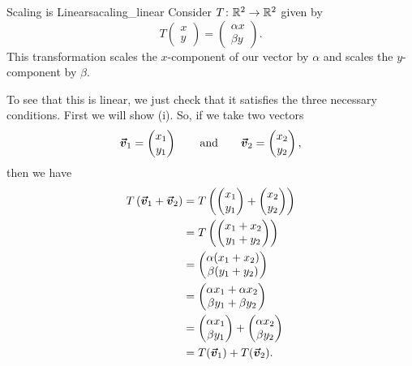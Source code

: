         \begin{ex}{Scaling is Linear}{sacaling_linear}
        Consider $T \colon \mathbb{R}^2 \to \mathbb{R}^2$ given by
        \[
        T\begin{pmatrix} x\\ y \end{pmatrix}
        = \begin{pmatrix} \alpha x\\ \beta y \end{pmatrix}.
        \]
        This transformation scales the $x$-component of our vector by $\alpha$ and scales the $y$-component by $\beta$.
        
        To see that this is linear, we just check that it satisfies the three necessary conditions.  First we will show (i). So, if we take two vectors
        \[
        \boldsymbol{\boldsymbol{\vec{v}}}_1 = \begin{pmatrix} x_1 \\ y_1 \end{pmatrix} \qquad \textrm{and} \qquad \boldsymbol{\boldsymbol{\vec{v}}}_2 = \begin{pmatrix} x_2 \\ y_2 \end{pmatrix},
        \]
        then we have
        \begin{align*}
        T\left( \boldsymbol{\boldsymbol{\vec{v}}}_1 + \boldsymbol{\boldsymbol{\vec{v}}}_2\right)&= T \left( \begin{pmatrix} x_1 \\ y_1 \end{pmatrix} + \begin{pmatrix} x_2 \\ y_2 \end{pmatrix} \right)\\
        &= T\left( \begin{pmatrix} x_1 + x_2 \\ y_1 + y_2 \end{pmatrix} \right)\\
        &= \begin{pmatrix} \alpha(x_1 + x_2) \\ \beta(y_1 + y_2)\end{pmatrix}\\
        &= \begin{pmatrix} \alpha x_1 + \alpha x_2 \\ \beta y_1 + \beta y_2 \end{pmatrix}\\
        &= \begin{pmatrix} \alpha x_1 \\ \beta y_1 \end{pmatrix} + \begin{pmatrix} \alpha x_2 \\ \beta y_2 \end{pmatrix} \\
        &= T(\boldsymbol{\boldsymbol{\vec{v}}}_1)+T(\boldsymbol{\boldsymbol{\vec{v}}}_2).
        \end{align*}
        

\end{ex}
